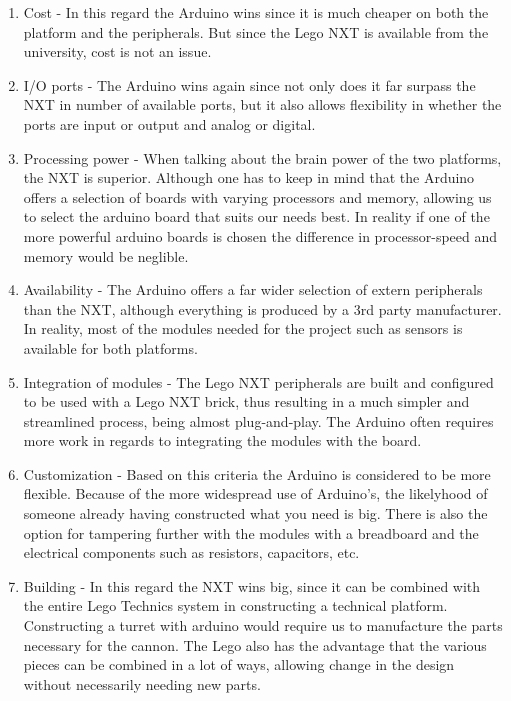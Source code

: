 \begin{enumerate}
  \item Cost - In this regard the Arduino wins since it is much cheaper on both
  the platform and the peripherals. But since the Lego NXT is available from the
  university, cost is not an issue.
  \item I/O ports - The Arduino wins again since not only does it far surpass
  the NXT in number of available ports, but it also allows flexibility in
  whether the ports are input or output and analog or digital.
  \item Processing power - When talking about the brain power of the two
  platforms, the NXT is superior. Although one has to keep in mind that the
  Arduino offers a selection of boards with varying processors and memory,
  allowing us to select the arduino board that suits our needs best. In reality
  if one of the more powerful arduino boards is chosen the difference in
  processor-speed and memory would be neglible.
  \item Availability - The Arduino offers a far wider selection of extern
  peripherals than the NXT, although everything is produced by a 3rd party
  manufacturer.
  In reality, most of the modules needed for the project such as sensors is
  available for both platforms.
  \item Integration of modules - The Lego NXT peripherals are built and
  configured to be used with a Lego NXT brick, thus resulting in a much simpler
  and streamlined process, being almost plug-and-play. The Arduino often
  requires more work in regards to integrating the modules with the board.
  \item Customization - Based on this criteria the Arduino is considered to be
  more flexible. Because of the more widespread use of Arduino's, the
  likelyhood of someone already having constructed what you need is big. There
  is also the option for tampering further with the modules with a breadboard
  and the electrical components such as resistors, capacitors, etc.
  \item Building - In this regard the NXT wins big, since it can be combined
  with the entire Lego Technics system in constructing a technical platform.
  Constructing a turret with arduino would require us to manufacture the parts
  necessary for the cannon. The Lego also has the advantage that the various
  pieces can be combined in a lot of ways, allowing change in the design
  without necessarily needing new parts.
\end{enumerate}

